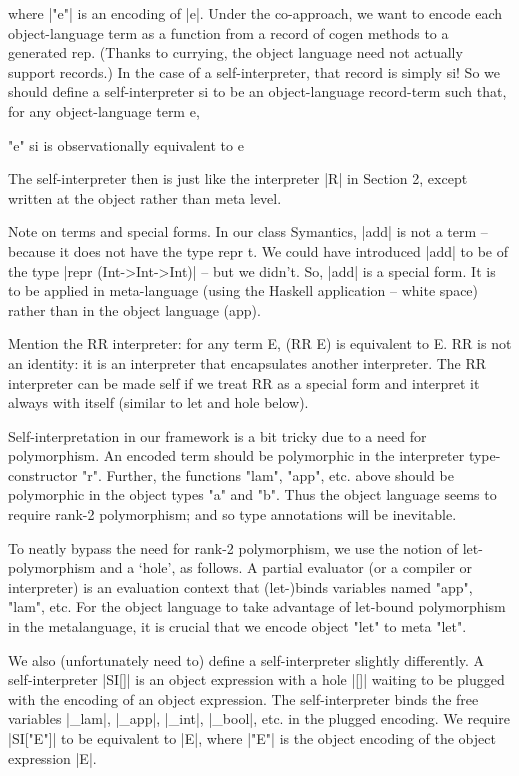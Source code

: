 \documentclass[preprint]{sigplanconf}
\begin{document}
where |"e"| is an encoding of |e|.  Under the co-approach, we want to encode
each object-language term as a function from a record of cogen methods
to a generated rep.  (Thanks to currying, the object language need not
actually support records.)  In the case of a self-interpreter, that
record is simply si!  So we should define a self-interpreter si to be an
object-language record-term such that, for any object-language term e,

\begin{code}
  "e" si    is observationally equivalent to    e
\end{code}

The self-interpreter then is just like the interpreter
|R| in Section 2, except written at the object rather than meta level.

Note on terms and special forms. In our class Symantics, |add|
is not a term -- because it does not have the type repr t. We could
have introduced |add| to be of the type |repr (Int->Int->Int)| -- but we
didn't. So, |add| is a special form. It is to be applied in
meta-language (using the Haskell application -- white space) rather
than in the object language (app). 

Mention the RR interpreter: for any term E, (RR E) is equivalent to E.
RR is not an identity: it is an interpreter that encapsulates another
interpreter. The RR interpreter can be made self if we treat RR as a
special form and interpret it always with itself (similar to let and
hole below).


Self-interpretation in our framework is
a bit tricky due to a need for polymorphism.  An encoded term should
be polymorphic in the interpreter type-constructor "r".  Further, the
functions "lam", "app", etc. above should be polymorphic in the object
types "a" and "b".  Thus the object language seems to require rank-2
polymorphism; and so type annotations will be inevitable.


To neatly bypass the need for rank-2 polymorphism, we use the notion
of let-polymorphism and a `hole', as follows.  A partial evaluator (or
a compiler or interpreter) is an evaluation context that (let-)binds
variables named "app", "lam", etc.  For the object language to
take advantage of let-bound polymorphism in the metalanguage, it
is crucial that we encode object "let" to meta "let".  

We also (unfortunately need to) define a self-interpreter slightly
differently.  A self-interpreter |SI[]| is an object expression with a
hole |[]| waiting to be plugged with the encoding of an object expression.
The self-interpreter binds the free variables |_lam|, |_app|, |_int|, |_bool|,
etc. in the plugged encoding.  We require |SI["E"]| to be equivalent to |E|,
where |"E"| is the object encoding of the object expression |E|.
\end{document}
